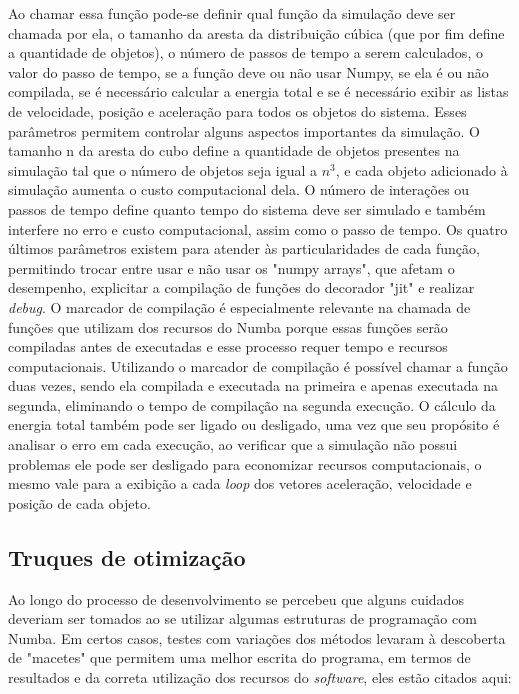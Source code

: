 \documentclass[
	12pt,				%
	a4paper,			%
	english,			%
	openright,				%
	brazil,				%
	oneside]{abntex2}
\begin{document}
	Ao chamar essa função pode-se definir qual função da simulação deve ser chamada por ela, o tamanho da aresta da distribuição cúbica (que por fim define a quantidade de objetos), o número de passos de tempo a serem calculados, o valor do passo de tempo, se a função deve ou não usar Numpy, se ela é ou não compilada, se é necessário calcular a energia total e se é necessário exibir as listas de velocidade, posição e aceleração para todos os objetos do sistema. Esses parâmetros permitem controlar alguns aspectos importantes da simulação. O tamanho n da aresta do cubo define a quantidade de objetos presentes na simulação tal que o número de objetos seja igual a $n^3$, e cada objeto adicionado à simulação aumenta o custo computacional dela. O número de interações ou passos de tempo define quanto tempo do sistema deve ser simulado e também interfere no erro e custo computacional, assim como o passo de tempo. Os quatro últimos parâmetros existem para atender às particularidades de cada função, permitindo trocar entre usar e não usar os "numpy arrays", que afetam o desempenho, explicitar a compilação de funções do decorador "jit" e realizar \textit{debug}. O marcador de compilação é especialmente relevante na chamada de funções que utilizam dos recursos do Numba porque essas funções serão compiladas antes de executadas e esse processo requer tempo e recursos computacionais. Utilizando o marcador de compilação é possível chamar a função duas vezes, sendo ela compilada e executada na primeira e apenas executada na segunda, eliminando o tempo de compilação na segunda execução. O cálculo da energia total também pode ser ligado ou desligado, uma vez que seu propósito é analisar o erro em cada execução, ao verificar que a simulação não possui problemas ele pode ser desligado para economizar recursos computacionais, o mesmo vale para a exibição a cada \textit{loop} dos vetores aceleração, velocidade e posição de cada objeto.
	
	\subsection{Truques de otimização}
	Ao longo do processo de desenvolvimento se percebeu que alguns cuidados deveriam ser tomados ao se utilizar algumas estruturas de programação com Numba. Em certos casos, testes com variações dos métodos levaram à descoberta de "macetes" que permitem uma melhor escrita do programa, em termos de resultados e da correta utilização dos recursos do \textit{software}, eles estão citados aqui:
	
\end{document}
